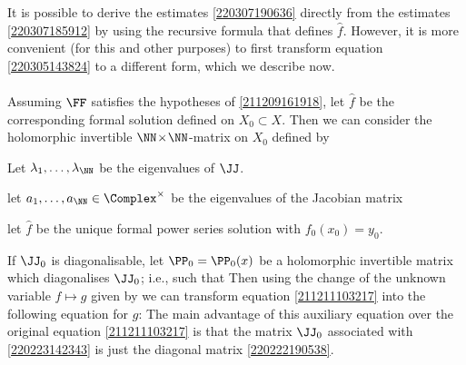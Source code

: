 \documentclass[11pt]{article}
\begin{document}
It is possible to derive the estimates \eqref{220307190636} directly from the estimates \eqref{220307185912} by using the recursive formula that defines $\hat{f}$.
However, it is more convenient (for this and other purposes) to first transform equation \eqref{220305143824} to a different form, which we describe now.

\paragraph{}
Assuming $\FF$ satisfies the hypotheses of \autoref{211209161918}, let $\hat{f}$ be the corresponding formal solution defined on $X_0 \subset X$.
Then we can consider the holomorphic invertible $\NN\!\times\!\NN$-matrix on $X_0$ defined by



Let $\lambda_1, \ldots, \lambda_\NN$ be the eigenvalues of $\JJ$.



\HRule




let $a_1, \ldots, a_\NN \in \Complex^\times$ be the eigenvalues of the Jacobian matrix







\HRule

 let $\hat{f}$ be the unique formal power series solution with $f_0 (x_0) = y_0$.








If $\JJ_0$ is diagonalisable, let $\PP_0 = \PP_0 (x)$ be a holomorphic invertible matrix which diagonalises $\JJ_0$; i.e., such that 
Then using the change of the unknown variable $f \mapsto g$ given by
we can transform equation \eqref{211211103217} into the following equation for $g$:
The main advantage of this auxiliary equation over the original equation \eqref{211211103217} is that the matrix $\JJ_0$ associated with \eqref{220223142343} is just the diagonal matrix \eqref{220222190538}.
\end{document}
